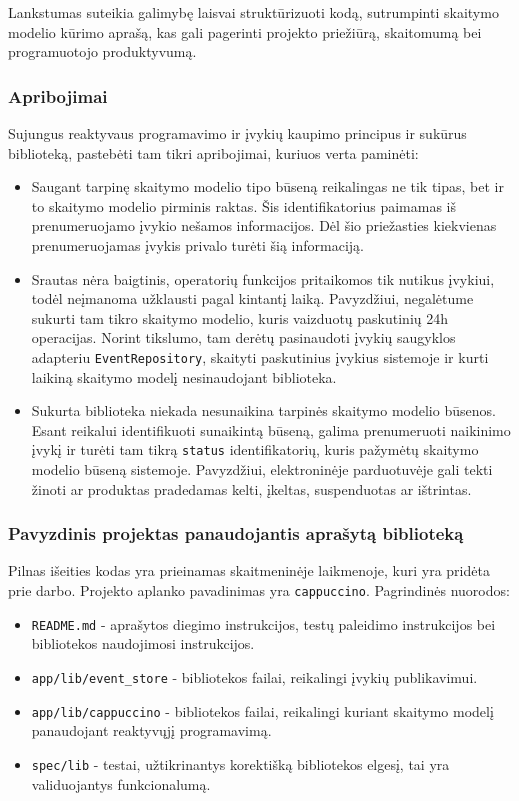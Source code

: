 Lankstumas suteikia galimybę laisvai struktūrizuoti kodą, sutrumpinti skaitymo modelio kūrimo aprašą, kas gali pagerinti projekto priežiūrą, skaitomumą bei programuotojo produktyvumą.

\subsubsection{Apribojimai}

Sujungus reaktyvaus programavimo ir įvykių kaupimo principus ir sukūrus biblioteką, pastebėti tam tikri apribojimai, kuriuos verta paminėti:

\begin{itemize}
  \item Saugant tarpinę skaitymo modelio tipo būseną reikalingas ne tik tipas, bet ir to skaitymo modelio pirminis raktas. Šis identifikatorius paimamas iš prenumeruojamo įvykio nešamos informacijos. Dėl šio priežasties kiekvienas prenumeruojamas įvykis privalo turėti šią informaciją.
  \item Srautas nėra baigtinis, operatorių funkcijos pritaikomos tik nutikus įvykiui, todėl neįmanoma užklausti pagal kintantį laiką. Pavyzdžiui, negalėtume sukurti tam tikro skaitymo modelio, kuris vaizduotų paskutinių 24h operacijas. Norint tikslumo, tam derėtų pasinaudoti įvykių saugyklos adapteriu \lstinline|EventRepository|, skaityti paskutinius įvykius sistemoje ir kurti laikiną skaitymo modelį nesinaudojant biblioteka.
  \item Sukurta biblioteka niekada nesunaikina tarpinės skaitymo modelio būsenos. Esant reikalui identifikuoti sunaikintą būseną, galima prenumeruoti naikinimo įvykį ir turėti tam tikrą \lstinline|status| identifikatorių, kuris pažymėtų skaitymo modelio būseną sistemoje. Pavyzdžiui, elektroninėje parduotuvėje gali tekti žinoti ar produktas pradedamas kelti, įkeltas, suspenduotas ar ištrintas.
\end{itemize}

\subsubsection{Pavyzdinis projektas panaudojantis aprašytą biblioteką}

Pilnas išeities kodas yra prieinamas skaitmeninėje laikmenoje, kuri yra pridėta prie darbo. Projekto aplanko pavadinimas yra \lstinline|cappuccino|. Pagrindinės nuorodos:

\begin{itemize}
  \item \lstinline|README.md| - aprašytos diegimo instrukcijos, testų paleidimo instrukcijos bei bibliotekos naudojimosi instrukcijos.
  \item \lstinline|app/lib/event_store| - bibliotekos failai, reikalingi įvykių publikavimui.
  \item \lstinline|app/lib/cappuccino| - bibliotekos failai, reikalingi kuriant skaitymo modelį panaudojant reaktyvųjį programavimą.
  \item \lstinline|spec/lib| - testai, užtikrinantys korektišką bibliotekos elgesį, tai yra validuojantys funkcionalumą.
\end{itemize}
